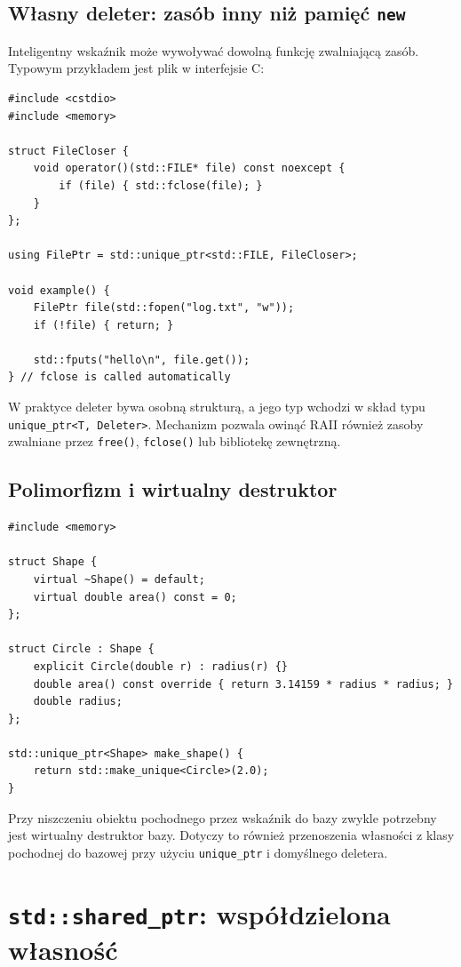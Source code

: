 \subsection{Własny deleter: zasób inny niż pamięć \texttt{new}}

Inteligentny wskaźnik może wywoływać dowolną funkcję zwalniającą
zasób. Typowym przykładem jest plik w interfejsie C:

\begin{lstlisting}
#include <cstdio>
#include <memory>

struct FileCloser {
    void operator()(std::FILE* file) const noexcept {
        if (file) { std::fclose(file); }
    }
};

using FilePtr = std::unique_ptr<std::FILE, FileCloser>;

void example() {
    FilePtr file(std::fopen("log.txt", "w"));
    if (!file) { return; }

    std::fputs("hello\n", file.get());
} // fclose is called automatically
\end{lstlisting}

W praktyce deleter bywa osobną strukturą, a jego typ wchodzi
w skład typu \texttt{unique\_ptr<T, Deleter>}. Mechanizm pozwala
owinąć RAII również zasoby zwalniane przez \texttt{free()},
\texttt{fclose()} lub bibliotekę zewnętrzną.

\subsection{Polimorfizm i wirtualny destruktor}

\begin{lstlisting}
#include <memory>

struct Shape {
    virtual ~Shape() = default;
    virtual double area() const = 0;
};

struct Circle : Shape {
    explicit Circle(double r) : radius(r) {}
    double area() const override { return 3.14159 * radius * radius; }
    double radius;
};

std::unique_ptr<Shape> make_shape() {
    return std::make_unique<Circle>(2.0);
}
\end{lstlisting}

Przy niszczeniu obiektu pochodnego przez wskaźnik do bazy
zwykle potrzebny jest wirtualny destruktor bazy.
Dotyczy to również przenoszenia własności z klasy pochodnej
do bazowej przy użyciu \texttt{unique\_ptr} i domyślnego deletera.

\section{\texttt{std::shared\_ptr}: współdzielona własność}

